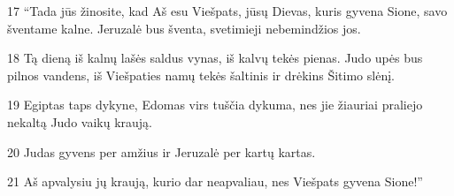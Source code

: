 \par 17 “Tada jūs žinosite, kad Aš esu Viešpats, jūsų Dievas, kuris gyvena Sione, savo šventame kalne. Jeruzalė bus šventa, svetimieji nebemindžios jos. 
\par 18 Tą dieną iš kalnų lašės saldus vynas, iš kalvų tekės pienas. Judo upės bus pilnos vandens, iš Viešpaties namų tekės šaltinis ir drėkins Šitimo slėnį. 
\par 19 Egiptas taps dykyne, Edomas virs tuščia dykuma, nes jie žiauriai praliejo nekaltą Judo vaikų kraują. 
\par 20 Judas gyvens per amžius ir Jeruzalė per kartų kartas. 
\par 21 Aš apvalysiu jų kraują, kurio dar neapvaliau, nes Viešpats gyvena Sione!”



